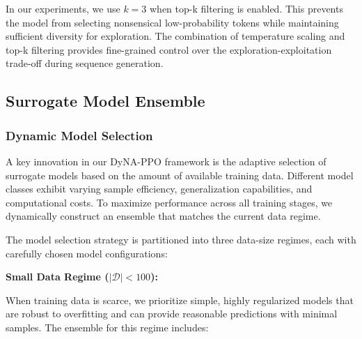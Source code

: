 \documentclass[conference]{IEEEtran}
\begin{document}
In our experiments, we use $k = 3$ when top-k filtering is enabled. This prevents the model from selecting nonsensical low-probability tokens while maintaining sufficient diversity for exploration. The combination of temperature scaling and top-k filtering provides fine-grained control over the exploration-exploitation trade-off during sequence generation.






\subsection{Surrogate Model Ensemble}

\subsubsection{Dynamic Model Selection}

A key innovation in our DyNA-PPO framework is the adaptive selection of surrogate models based on the amount of available training data. Different model classes exhibit varying sample efficiency, generalization capabilities, and computational costs. To maximize performance across all training stages, we dynamically construct an ensemble that matches the current data regime.

The model selection strategy is partitioned into three data-size regimes, each with carefully chosen model configurations:

\textbf{Small Data Regime ($|\mathcal{D}| < 100$):}

When training data is scarce, we prioritize simple, highly regularized models that are robust to overfitting and can provide reasonable predictions with minimal samples. The ensemble for this regime includes:
\end{document}
